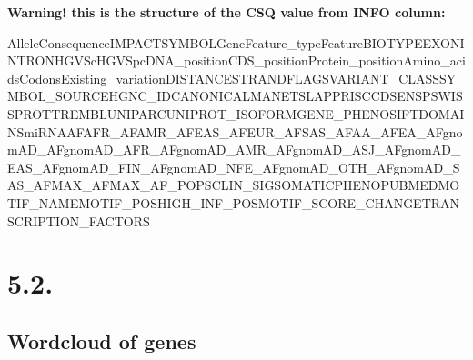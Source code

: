 \documentclass[
  letterpaper,
  DIV=11,
  numbers=noendperiod]{scrreprt}
\newenvironment{Shaded}{\begin{snugshade}}{\end{snugshade}}
\begin{document}
\begin{tcolorbox}[enhanced jigsaw, bottomrule=.15mm, breakable, rightrule=.15mm, leftrule=.75mm, toprule=.15mm, opacityback=0, colframe=quarto-callout-warning-color-frame, colback=white, left=2mm, arc=.35mm]

\vspace{-3mm}\textbf{Warning! this is the structure of the CSQ value from INFO column:}\vspace{3mm}

Allele\textbar Consequence\textbar IMPACT\textbar SYMBOL\textbar Gene\textbar Feature\_type\textbar Feature\textbar BIOTYPE\textbar EXON\textbar INTRON\textbar HGVSc\textbar HGVSp\textbar cDNA\_position\textbar CDS\_position\textbar Protein\_position\textbar Amino\_acids\textbar Codons\textbar Existing\_variation\textbar DISTANCE\textbar STRAND\textbar FLAGS\textbar VARIANT\_CLASS\textbar SYMBOL\_SOURCE\textbar HGNC\_ID\textbar CANONICAL\textbar MANE\textbar TSL\textbar APPRIS\textbar CCDS\textbar ENSP\textbar SWISSPROT\textbar TREMBL\textbar UNIPARC\textbar UNIPROT\_ISOFORM\textbar GENE\_PHENO\textbar SIFT\textbar DOMAINS\textbar miRNA\textbar AF\textbar AFR\_AF\textbar AMR\_AF\textbar EAS\_AF\textbar EUR\_AF\textbar SAS\_AF\textbar AA\_AF\textbar EA\_AF\textbar gnomAD\_AF\textbar gnomAD\_AFR\_AF\textbar gnomAD\_AMR\_AF\textbar gnomAD\_ASJ\_AF\textbar gnomAD\_EAS\_AF\textbar gnomAD\_FIN\_AF\textbar gnomAD\_NFE\_AF\textbar gnomAD\_OTH\_AF\textbar gnomAD\_SAS\_AF\textbar MAX\_AF\textbar MAX\_AF\_POPS\textbar CLIN\_SIG\textbar SOMATIC\textbar PHENO\textbar PUBMED\textbar MOTIF\_NAME\textbar MOTIF\_POS\textbar HIGH\_INF\_POS\textbar MOTIF\_SCORE\_CHANGE\textbar TRANSCRIPTION\_FACTORS

\end{tcolorbox}

\begin{Shaded}
\begin{Highlighting}[]

\end{Highlighting}
\end{Shaded}

\section{5.2.}\label{section}

\subsection{Wordcloud of genes}\label{wordcloud-of-genes}
\end{document}

